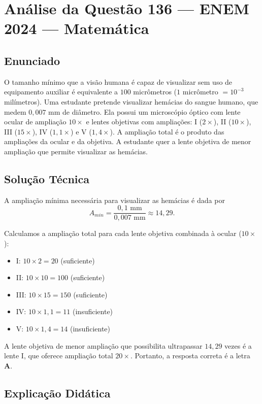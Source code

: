 \documentclass{article}
\begin{document}
\section*{Análise da Questão 136 — ENEM 2024 — Matemática}

\subsection*{Enunciado}
O tamanho mínimo que a visão humana é capaz de visualizar sem uso de equipamento auxiliar é equivalente a $100$ micrômetros ($1$ micrômetro $= 10^{-3}$ milímetros). Uma estudante pretende visualizar hemácias do sangue humano, que medem $0,007$ mm de diâmetro. Ela possui um microscópio óptico com lente ocular de ampliação $10\times$ e lentes objetivas com ampliações: I ($2\times$), II ($10\times$), III ($15\times$), IV ($1,1\times$) e V ($1,4\times$). A ampliação total é o produto das ampliações da ocular e da objetiva. A estudante quer a lente objetiva de menor ampliação que permite visualizar as hemácias.

\subsection*{Solução Técnica}

A ampliação mínima necessária para visualizar as hemácias é dada por
\[
A_{min} = \frac{0,1 \text{ mm}}{0,007 \text{ mm}} \approx 14,29.
\]

Calculamos a ampliação total para cada lente objetiva combinada à ocular ($10\times$):
\begin{itemize}
  \item I: $10 \times 2 = 20$ (suficiente)
  \item II: $10 \times 10 = 100$ (suficiente)
  \item III: $10 \times 15 = 150$ (suficiente)
  \item IV: $10 \times 1{,}1 = 11$ (insuficiente)
  \item V: $10 \times 1{,}4 = 14$ (insuficiente)
\end{itemize}

A lente objetiva de menor ampliação que possibilita ultrapassar $14,29$ vezes é a lente I, que oferece ampliação total $20\times$. Portanto, a resposta correta é a letra \textbf{A}.

\subsection*{Explicação Didática}
\end{document}
